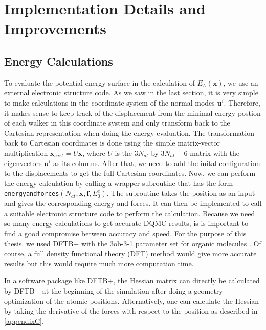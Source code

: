 \documentclass [12pt]{report}
\begin{document}
\section{Implementation Details and Improvements}
\subsection{Energy Calculations}
To evaluate the potential energy surface in the calculation of $E_L(\bm{x})$, we use an external electronic structure code. As we saw in the last section, it is very simple to make calculations in the coordinate system of the normal modes $\bm{u}^i$. Therefore, it makes sense to keep track of the displacement from the minimal energy postion of each walker in this coordinate system and only transform back to the Cartesian representation when doing the energy evaluation. The transformation back to Cartesian coordinates is done using the simple matrix-vector multiplication $\bm{x}_{cart} = U\bm{x}$, where $U$ is the $3N_{at}$ by $3N_{at} - 6$ matrix with the eigenvectors $\bm{u}^i$ as its columns. After that, we need to add the inital configuration to the displacements to get the full Cartesian coordinates. Now, we can perform the energy calculation by calling a wrapper subroutine that has the form \verb+energyandforces+$(N_{at},\bm{x},\bm{f},E^e_0)$. The subroutine takes the position as an input and gives the corresponding energy and forces. It can then be implemented to call a suitable electronic structure code to perform the calculation. Because we need so many energy calculations to get accurate DQMC results, is is important to find a good compromise between accuracy and speed. For the purpose of this thesis, we used DFTB+ \cite{dftbp,dftbp2} with the 3ob-3-1 parameter set for organic molecules \cite{3ob-3-1}. Of course, a full density functional theory (DFT) method would give more accurate results but this would require much more computation time.

In a software package like DFTB+, the Hessian matrix can directly be calculated by DFTB+ at the beginning of the simulation after doing a geometry optimization of the atomic positions. Alternatively, one can calculate the Hessian by taking the derivative of the forces with respect to the position as described in \ref{appendixC}.
\end{document}
